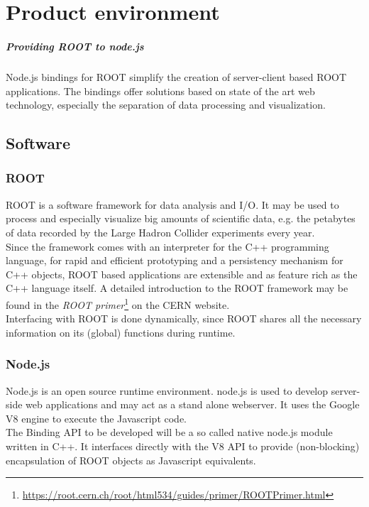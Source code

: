 \chapter{Product environment}

\paragraph{Providing ROOT to node.js}
Node.js bindings for ROOT simplify the creation of server-client based ROOT applications. The bindings offer solutions based on state of the art web technology, especially the separation of data 
processing and visualization.\\

\section{Software}
\subsection{ROOT}
ROOT is a software framework for data analysis and I/O. It may be used to process and especially visualize big amounts of scientific data, e.g. the petabytes of data recorded by the Large Hadron Collider experiments every year.\\
Since the framework comes with an interpreter for the C++ programming language, for rapid and efficient prototyping and a persistency mechanism for C++ objects, ROOT based applications are  extensible and as feature rich as the C++ language itself.
A detailed introduction to the ROOT framework may be found in the \textit{ROOT  primer}\footnote[1]{\url{https://root.cern.ch/root/html534/guides/primer/ROOTPrimer.html}}
on the CERN website.\\
Interfacing with ROOT is done dynamically, since ROOT shares all the necessary information on its (global) functions during runtime.

\subsection{Node.js}
Node.js is an open source runtime environment. node.js is used to develop server-side web applications and may act as a 
stand alone webserver. It uses the Google V8 engine to execute the Javascript code. \\
The Binding API to be developed will be a so called native node.js module written in C++. It interfaces directly with the V8 API to provide (non-blocking) encapsulation of ROOT objects as Javascript equivalents.

